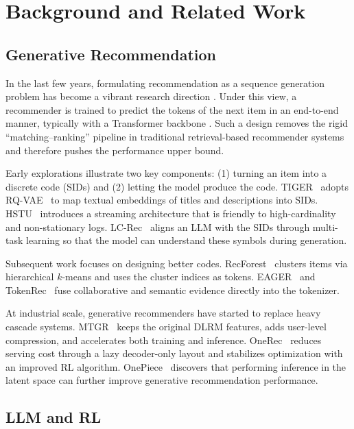 \section{Background and Related Work}
\label{bg}
\subsection{Generative Recommendation}

In the last few years, formulating recommendation as a sequence generation problem has become a vibrant research direction \citep{TIGER, GenRec-Direction}.  
Under this view, a recommender is trained to predict the tokens of the next item in an end-to-end manner, typically with a Transformer backbone \citep{Transformer}.  
Such a design removes the rigid  “matching–ranking” pipeline in traditional retrieval-based recommender systems \citep{SASRec, GRU4Rec} and therefore pushes the performance upper bound.

Early explorations illustrate two key components: (1) turning an item into a discrete code (SIDs) and (2) letting the model produce the code.  
TIGER~\citep{TIGER} adopts RQ-VAE~\citep{rqvae} to map textual embeddings of titles and descriptions into SIDs.  
HSTU~\citep{HSTU} introduces a streaming architecture that is friendly to high-cardinality and non-stationary logs.  
LC-Rec~\citep{LCRec} aligns an LLM with the SIDs through multi-task learning so that the model can understand these symbols during generation.  

Subsequent work focuses on designing better codes.  
RecForest~\citep{recforest} clusters items via hierarchical $k$-means and uses the cluster indices as tokens.  
EAGER~\citep{eagar} and TokenRec~\citep{TOKENRec} fuse collaborative and semantic evidence directly into the tokenizer.  

At industrial scale, generative recommenders have started to replace heavy cascade systems.  
MTGR~\citep{mtgr} keeps the original DLRM features, adds user-level compression, and accelerates both training and inference.  
OneRec~\citep{onerec-tech-v2} reduces serving cost through a lazy decoder-only layout and stabilizes optimization with an improved RL algorithm.  
OnePiece~\citep{OnePiece} discovers that performing inference in the latent space can further improve generative recommendation performance.

\subsection{LLM and RL}


